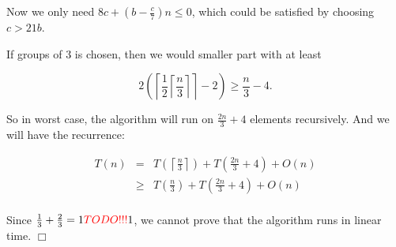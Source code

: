 \documentclass[a4paper,10pt]{article}
\newcommand{\qed}{\hfill \ensuremath{\Box}}
\newcommand{\nless}{\textcolor{red}{TODO!!!}{} }
\begin{document}
Now we only need $8c + \left(b - \frac{c}{7}\right)n \leq 0$, which could be satisfied by choosing $c > 21b$.

If groups of 3 is chosen, then we would smaller part with at least

$$2\left(\left\lceil\frac{1}{2}\left\lceil\frac{n}{3}\right\rceil\right\rceil -2\right) \geq \frac{n}{3} - 4.$$

So in worst case, the algorithm will run on $\frac{2n}{3} + 4$ elements recursively. And we will have the recurrence:

\begin{eqnarray*}
T(n) &=& T\left(\left\lceil\frac{n}{3}\right\rceil\right) + T\left(\frac{2n}{3} + 4\right) + O(n)\\
&\geq& T\left(\frac{n}{3}\right) + T\left(\frac{2n}{3} + 4\right) + O(n)\\
\end{eqnarray*}

Since $\frac{1}{3} + \frac{2}{3} = 1 \nless 1$,  we cannot prove that the algorithm runs in linear time.
\qed
\end{document}
